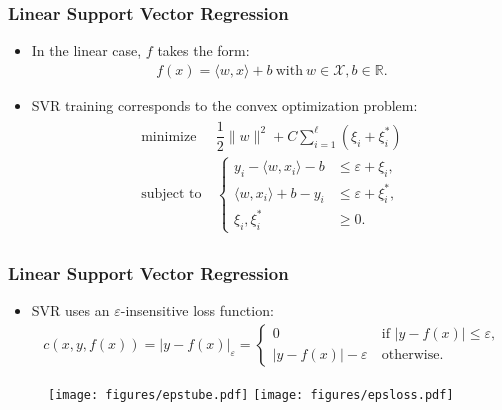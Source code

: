 \documentclass{beamer}
\newcommand{\nologo}{\setbeamertemplate{logo}{}}
\begin{document}
\begin{frame}
\frametitle{Linear Support Vector Regression}
\begin{itemize}
\item In the linear case, $ f $ takes the form:
\begin{align*}
f(x) = \langle w,x \rangle + b \ \text{with} \ w \in \mathcal{X}, b \in \mathbb{R} \text{.}
\end{align*}
\item SVR training corresponds to the convex optimization problem:
\begin{align*}
\begin{split}
\text{minimize} &\ \dfrac{1}{2}\| w \|^2 + C\sum_{i=1}^{\ell}(\xi_{i} + \xi_{i}^{*}) \\
\text{subject to} &\ \begin{cases}
y_{i} - \langle w,x_{i} \rangle - b &\leq \varepsilon + \xi_{i} \text{,}\\
\langle w,x_{i} \rangle + b - y_{i} &\leq \varepsilon + \xi_{i}^{*} \text{,}\\
\xi_{i}, \xi_{i}^{*} &\geq 0 \text{.}
\end{cases}
\end{split}
\end{align*}
\end{itemize}
\end{frame}

{\nologo
\begin{frame}
\frametitle{Linear Support Vector Regression}
\begin{itemize}
\item SVR uses an $ \varepsilon $-insensitive loss function:
\begin{align*}
c(x,y,f(x)) = \vert y - f(x) \vert_{\varepsilon} = \begin{cases}
0 &\ \text{if } \vert y - f(x) \vert \leq \varepsilon \text{,}\\
\vert y - f(x) \vert - \varepsilon &\ \text{otherwise} \text{.}
\end{cases}
\end{align*}
\end{itemize}
\begin{figure}[h]
  	\centering
  	\texttt{[image: figures/epstube.pdf]}
  	\texttt{[image: figures/epsloss.pdf]}
\end{figure}
\end{frame}}
\end{document}
